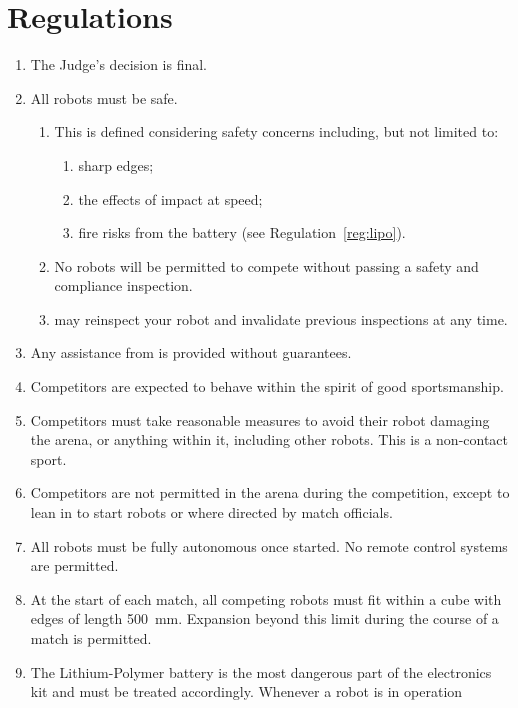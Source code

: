 \section{Regulations}
\label{sec:regs}

\begin{enumerate}
\item The Judge's decision is final.
\item All robots must be safe.
  \begin{enumerate}
    \item This is defined considering safety concerns including, but not limited
          to:
      \begin{enumerate}
        \item sharp edges;
        \item the effects of impact at speed;
        \item fire risks from the battery (see Regulation~\ref{reg:lipo}).
      \end{enumerate}
    \item No robots will be permitted to compete without passing a safety and
          compliance inspection.
    \item \staff may reinspect your robot and invalidate previous inspections at
          any time.
  \end{enumerate}
\item Any assistance from \staff is provided without guarantees.
\item Competitors are expected to behave within the spirit of good
      sportsmanship.
\item Competitors must take reasonable measures to avoid their robot damaging
      the arena, or anything within it, including other robots. This is a
      non-contact sport.
\item Competitors are not permitted in the arena during the competition,
      except to lean in to start robots or where directed by match officials.
\item All robots must be fully autonomous once started. No remote control
      systems are permitted.
\item At the start of each match, all competing robots must fit within a cube
      with edges of length \SI{500}{mm}. Expansion beyond this limit during the
      course of a match is permitted.
\item \label{reg:lipo}
      The Lithium-Polymer battery is the most dangerous part of the electronics
      kit and must be treated accordingly. Whenever a robot is in operation

\end{enumerate}
